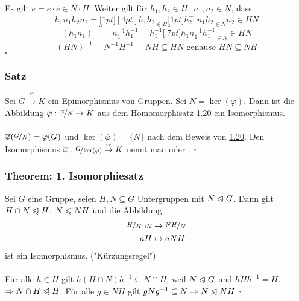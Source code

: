 \\
Es gilt $e=e\cdot e\in N\cdot H$. 
Weiter gilt für $h_1,h_2 \in H,~n_1,n_2 \in N$, dass
\[
h_1n_1h_2n_2=\underbracket[1pt][4pt]{h_1h_2}_{\in H} \underbracket[1pt]{h_2^{-1}n_1h_2}_{\in N}n_2 \in HN 
\]
\[
(h_1n_1)^{-1}=n_1^{-1}h_1^{-1}=h_1^{-1}\underbracket[.7pt]{h_1n_1^{-1}h_1^{-1}}_{\in N} \in HN 
\]
\[
(HN)^{-1}=N^{-1}H^{-1}=NH \subseteq HN \text{ genauso } HN \subseteq NH 
\]
\hfill $\square$

\subsubsection*{Satz}
Sei $G\stackrel{\varphi}{\to}K$ ein Epimorphismus von Gruppen. Sei $N=\ker(\varphi)$. 
Dann ist die Abbildung $\overline{\varphi}:\nicefrac{G}{N}\to K$ aus dem \hyperref[sub:der_homomorphiesatz]{Homomorphisatz 1.20} ein Isomorphismus.\\

\\
$\overline{\varphi}(\nicefrac{G}{N})=\varphi(G)$ und $\ker(\overline{\varphi})=\{N\}$ nach dem Beweis von \hyperref[sub:der_homomorphiesatz]{1.20}.
Den Isomorphismus $\overline{\varphi}:\nicefrac{G}{\ker(\varphi)} \stackrel{\cong}{\to}K$ nennt man  oder .
\hfill $\square$

\subsubsection*{Theorem: 1. Isomorphiesatz}
Sei $G$ eine Gruppe, seien $H,N\subseteq G$ Untergruppen mit $N\trianglelefteqslant G$. 
Dann gilt $H\cap N\trianglelefteqslant H$, $N \trianglelefteqslant NH$ und die Abbildung
\begin{equation*}
\begin{aligned}
	\nicefrac{H}{H\cap N} &\to \nicefrac{NH}{N}\\
	aH &\mapsto aNH
\end{aligned}
\end{equation*}
ist ein Isomorphismus. \qquad ("Kürzungsregel")\\

\\
Für alle $h\in H$ gilt $h(H\cap N)h^{-1}\subseteq N\cap H$, weil $N\trianglelefteqslant G$ und $hHh^{-1}=H$. 
$\Rightarrow N\cap H \trianglelefteqslant H$. 
Für alle $g\in NH$ gilt $gNg^{-1}\subseteq N \Rightarrow N\trianglelefteqslant NH$
\hfill $\square$

